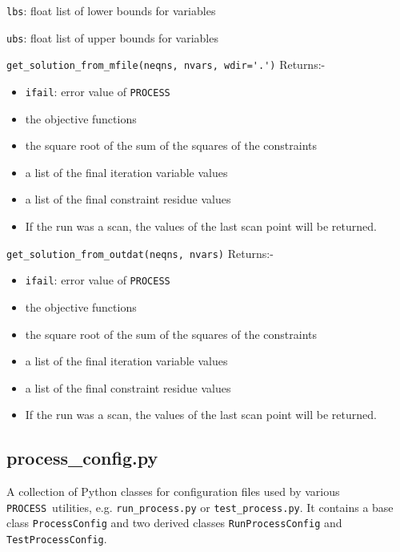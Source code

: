 \documentclass[11pt,a4paper]{report}
\newcommand{\process}{\mbox{\texttt{PROCESS}}}
\begin{document}
\begin{description}
  \texttt{lbs}: float list of lower bounds for variables

  \texttt{ubs}: float list of upper bounds for variables

\item{\verb|get_solution_from_mfile(neqns, nvars, wdir='.')|} Returns:-

\begin{itemize}
\item \texttt{ifail}: error value of \process
\item the objective functions
\item the square root of the sum of the squares of the constraints
\item a list of the final iteration variable values
\item a list of the final constraint residue values
\item If the run was a scan, the values of the last scan point will be returned.
\end{itemize}

\item{\verb|get_solution_from_outdat(neqns, nvars)|} Returns:-

\begin{itemize}
\item \texttt{ifail}: error value of \process
\item the objective functions
\item the square root of the sum of the squares of the constraints
\item a list of the final iteration variable values
\item a list of the final constraint residue values
\item If the run was a scan, the values of the last scan point will be returned.
\end{itemize}

\end{description}

\subsection{process\_config.py}

A collection of Python classes for configuration files used by various
\process\ utilities, e.g. \texttt{run\_process.py} or
\texttt{test\_process.py}. It contains a base class \texttt{ProcessConfig} and
two derived classes \texttt{RunProcessConfig} and \texttt{TestProcessConfig}.
\end{document}
